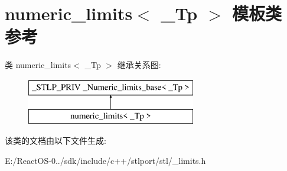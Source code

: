 \hypertarget{classnumeric__limits}{}\section{numeric\+\_\+limits$<$ \+\_\+\+Tp $>$ 模板类 参考}
\label{classnumeric__limits}
类 numeric\+\_\+limits$<$ \+\_\+\+Tp $>$ 继承关系图\+:\begin{figure}[H]
\begin{center}
\leavevmode
\includegraphics[height=2.000000cm]{classnumeric__limits}
\end{center}
\end{figure}


该类的文档由以下文件生成\+:\begin{DoxyCompactItemize}
\item 
E\+:/\+React\+O\+S-\/0../sdk/include/c++/stlport/stl/\+\_\+limits.\+h\end{DoxyCompactItemize}
